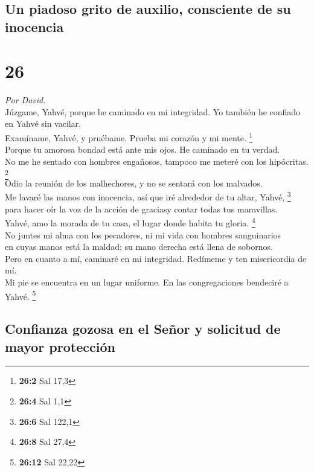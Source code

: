 \hypertarget{un-piadoso-grito-de-auxilio-consciente-de-su-inocencia}{%
\subsection{Un piadoso grito de auxilio, consciente de su
inocencia}\label{un-piadoso-grito-de-auxilio-consciente-de-su-inocencia}}

\hypertarget{section-25}{%
\section{26}\label{section-25}}

\emph{Por David.}\\
 Júzgame, Yahvé, porque he caminado en mi integridad. Yo
también he confiado en Yahvé sin vacilar.\\
 Examíname, Yahvé, y pruébame. Prueba mi corazón y mi
mente. \footnote{\textbf{26:2} Sal 17,3}\\
 Porque tu amorosa bondad está ante mis ojos. He caminado
en tu verdad.\\
 No me he sentado con hombres engañosos, tampoco me meteré
con los hipócritas. \footnote{\textbf{26:4} Sal 1,1}\\
 Odio la reunión de los malhechores, y no se sentará con
los malvados.\\
 Me lavaré las manos con inocencia, así que iré alrededor
de tu altar, Yahvé, \footnote{\textbf{26:6} Sal 122,1}\\
 para hacer oír la voz de la acción de graciasy contar
todas tus maravillas.\\
 Yahvé, amo la morada de tu casa, el lugar donde habita tu
gloria. \footnote{\textbf{26:8} Sal 27,4}\\
 No juntes mi alma con los pecadores, ni mi vida con
hombres sanguinarios\\
 en cuyas manos está la maldad; su mano derecha está
llena de sobornos.\\
 Pero en cuanto a mí, caminaré en mi integridad. Redímeme
y ten misericordia de mí.\\
 Mi pie se encuentra en un lugar uniforme. En las
congregaciones bendeciré a Yahvé. \footnote{\textbf{26:12} Sal 22,22}

\hypertarget{confianza-gozosa-en-el-seuxf1or-y-solicitud-de-mayor-protecciuxf3n}{%
\subsection{Confianza gozosa en el Señor y solicitud de mayor
protección}\label{confianza-gozosa-en-el-seuxf1or-y-solicitud-de-mayor-protecciuxf3n}}

